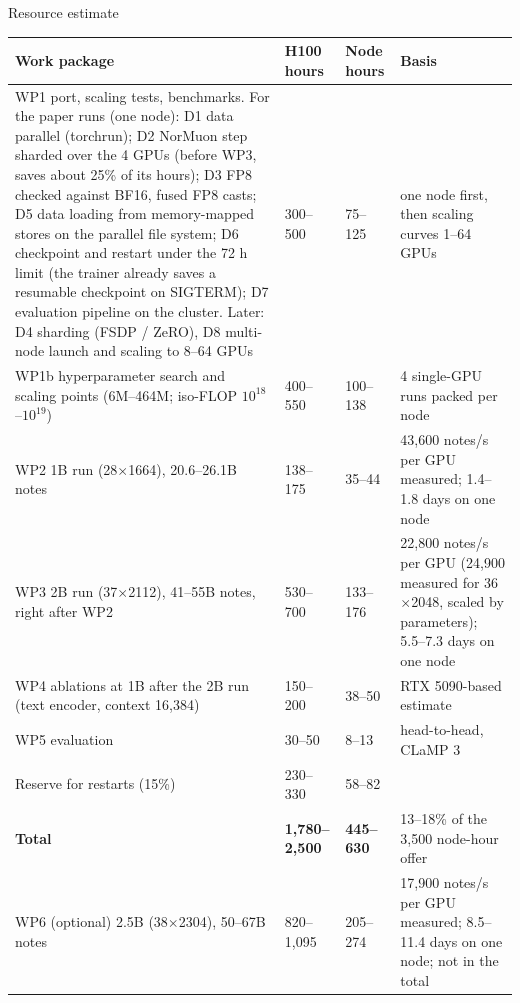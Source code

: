 \documentclass[11pt,a4paper]{article}
\makeatletter
\renewcommand\subsection{\@startsection{subsection}{2}{\z@}{-2.6ex \@plus -1ex \@minus -.2ex}{1.2ex \@plus .2ex}%
  {\normalfont\large\bfseries\color{head}}}
\makeatother
\begin{document}
\subsection{Resource estimate}\label{sec:resources}
\begin{tabularx}{\textwidth}{|L{5.0cm}|L{2.3cm}|L{2.2cm}|X|}
\hline
\textbf{Work package} & \textbf{H100 hours} & \textbf{Node hours} & \textbf{Basis}\\ \hline
WP1 port, scaling tests, benchmarks. For the paper runs (one node): D1 data parallel (torchrun); D2 NorMuon step
sharded over the 4 GPUs (before WP3, saves about 25\% of its hours); D3 FP8 checked against BF16, fused FP8 casts; D5
data loading from memory-mapped stores on the parallel file system; D6 checkpoint and restart under the 72 h limit (the trainer already saves a resumable checkpoint on SIGTERM); D7
evaluation pipeline on the cluster. Later: D4 sharding (FSDP / ZeRO), D8 multi-node launch and scaling to 8--64 GPUs
& 300--500 & 75--125 & one node first, then scaling curves 1--64 GPUs\\ \hline
WP1b hyperparameter search and scaling points (6M--464M; iso-FLOP $10^{18}$--$10^{19}$) & 400--550 & 100--138 &
4 single-GPU runs packed per node\\ \hline
WP2 1B run (28$\times$1664), 20.6--26.1B notes & 138--175 & 35--44 & 43,600 notes/s per GPU measured;
1.4--1.8 days on one node\\ \hline
WP3 2B run (37$\times$2112), 41--55B notes, right after WP2 & 530--700 & 133--176 & 22,800 notes/s per GPU
(24,900 measured for 36$\times$2048, scaled by parameters); 5.5--7.3 days on one node\\ \hline
WP4 ablations at 1B after the 2B run (text encoder, context 16,384) & 150--200 & 38--50 & RTX 5090-based estimate\\ \hline
WP5 evaluation & 30--50 & 8--13 & head-to-head, CLaMP 3\\ \hline
Reserve for restarts (15\%) & 230--330 & 58--82 & \\ \hline
\textbf{Total} & \textbf{1,780--2,500} & \textbf{445--630} & 13--18\% of the 3,500 node-hour offer\\ \hline
WP6 (optional) 2.5B (38$\times$2304), 50--67B notes & 820--1,095 & 205--274 & 17,900 notes/s per GPU measured;
8.5--11.4 days on one node; not in the total\\ \hline
\end{tabularx}
\vspace{4pt}
\end{document}
